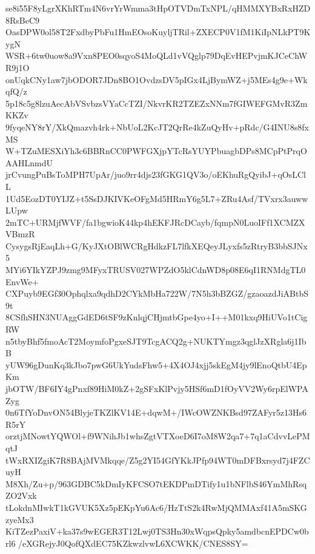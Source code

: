 se8i55F8yLgrXKhRTm4N6vrYrWmma3tHpOTVDmTxNPL/qHMMXYBxRxHZD8RsBeC9
OasDPW0ol58T2FxdbyPbFu1HmEOsoKuyljTRil+ZXECP0V1fM1KiIpNLkPT9KygN
WSR+6tw0uow8a9Vxn8PEO0sqyoS4MoQLd1vVQglp79DqEvHEPvjmKJCeChWR9j1O
onUqkCNy1aw7jbODOR7JDn8BO1OvdzsDV5pIGx4LjBymWZ+j5MEs4g9e+WkqfQ/z
5p18c5g8lzuAecAbVSvbzsVYaCcTZI/NkvrKR2TZEZxNNm7fGIWEFGMvR3ZmKKZv
9fyqeNY8rY/XkQmazvh4rk+NbUoL2KcJT2QrRe4kZuQyHv+pRdc/G4INU8s8fxMS
W+TZuMESXiYh3c6BBRnCC0PWFGXjpYTcRsYUYPbuagbDPs8MCpPtPrqOAAHLnmdU
jrCvungPuBsToMPH7UpAr/juo9rr4djs23fGKG1QV3o/oEKhuRgQyibJ+qOsLClL
1Ud5EozDT0YIJZ+t5SsDJKIVKeOFgMd5HRmY6g5L7+ZRu4Asf/TVxrx3auwwLUpw
2mTC+URMjfWVF/fa1bgwioK44kp4hEKFJRcDCayb/fqmpN0LuoIFf1XCMZXVBmzR
CysygsRjEaqLh+G/KyJXtOBlWCRgHdkzFL7lfkXEQeyJLyxfs5zRtryB3bbSJNx5
MYi6YIkYZPJ9zmg9MFyxTRUSV027WPZdO5klCdnWD8p08E6qI1RNMdgTL0EnvWe+
CXPuyb9EGf30Ophqlxa9qdhD2CYkMbHa722W/7N5h3bBZGZ/gzaoazdJiABtbS9t
8CSfhSHN3NUAggGdED6tSF9zKnlqjCHjmtbGpe4yo+I++M01kxq9HiUVo1tCigRW
n5tbyBhf5fmoAcT2MoymfoPgxeSJT9TcgACQ2g+NUKTYmgz3qglJzXRgla6j1IbB
yUW96gDunKq3kJbo7pwG6UkYudsFhw5+4X4OJ4xjj5skEgM4jy9lEnoQtbU4EpKm
jbOTW/BF6IY4gPnxf89HiM0kZ+2gSFxKlPvjy5HSf6mD1fOyVV2Wy6rpElWPAZyg
0n6TfYoDnvON54BlyjeTKZlKV14E+dqwM+/IWcOWZNKBsd97ZAFyr5z13Hs6R5rY
orztjMNowtYQWOl+f9WNihJb1whsZgtVTXoeD6I7oM8W2qa7+7q1aCdvvLePMqtJ
tWxRXIZgiK7R8BAjMVMkqqe/Z5g2YI54GfYKkJPfp94WT0mDFBxrsyd7j4FZCuyH
M8Xh/Zu+p/963GDBC5kDmIyKFCSO7tEKDPmDTify1u1bNFlbS46YmMhRsqZO2Vxk
tLokdnMIwkT1kGVUK5Xz5pEKpYu6Ac6/HzTtS2k4RwMjQMMAxf41A5mSKGzyeMx3
KiTZezPaxiV+ka37s9wEGER3T12Lwj0TS3Hn30xWqpsQpky5amdbcnEPDCw0brl6
/eXGRejyJ0QofQXdEC75KZkwzlvwL6XCWKK/CNES8SY=
